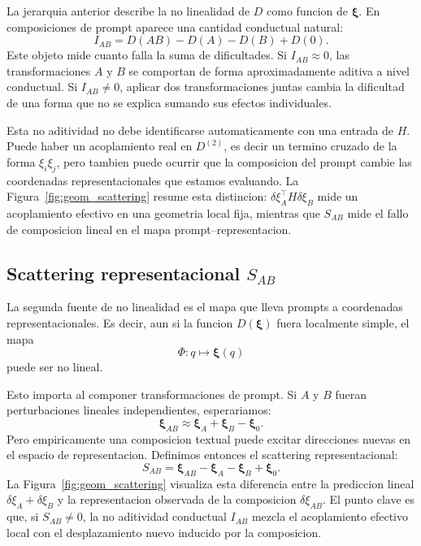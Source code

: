 \documentclass[10pt,twocolumn]{article}
\newcommand{\xrep}{\bm{\xi}}
\begin{document}
La jerarquia anterior describe la no linealidad de \(D\) como funcion de \(\xrep\). En composiciones de prompt aparece una cantidad conductual natural:
\[
I_{AB}
=
D(AB)-D(A)-D(B)+D(0).
\]
Este objeto mide cuanto falla la suma de dificultades. Si \(I_{AB}\approx0\), las transformaciones \(A\) y \(B\) se comportan de forma aproximadamente aditiva a nivel conductual. Si \(I_{AB}\neq0\), aplicar dos transformaciones juntas cambia la dificultad de una forma que no se explica sumando sus efectos individuales.

Esta no aditividad no debe identificarse automaticamente con una entrada de \(H\). Puede haber un acoplamiento real en \(D^{(2)}\), es decir un termino cruzado de la forma \(\xi_i\xi_j\), pero tambien puede ocurrir que la composicion del prompt cambie las coordenadas representacionales que estamos evaluando. La Figura~\ref{fig:geom_scattering} resume esta distincion: \(\delta\xi_A^\top H\delta\xi_B\) mide un acoplamiento efectivo en una geometria local fija, mientras que \(S_{AB}\) mide el fallo de composicion lineal en el mapa prompt--representacion.

\subsection{Scattering representacional \texorpdfstring{\(S_{AB}\)}{SAB}}

La segunda fuente de no linealidad es el mapa que lleva prompts a coordenadas representacionales. Es decir, aun si la funcion \(D(\xrep)\) fuera localmente simple, el mapa
\[
\Phi:q\longmapsto\xrep(q)
\]
puede ser no lineal.

Esto importa al componer transformaciones de prompt. Si \(A\) y \(B\) fueran perturbaciones lineales independientes, esperariamos:
\[
\xrep_{AB}
\approx
\xrep_A+\xrep_B-\xrep_0.
\]
Pero empiricamente una composicion textual puede excitar direcciones nuevas en el espacio de representacion. Definimos entonces el scattering representacional:
\[
S_{AB}
=
\xrep_{AB}
-\xrep_A
-\xrep_B
+\xrep_0.
\]
La Figura~\ref{fig:geom_scattering} visualiza esta diferencia entre la prediccion lineal \(\delta\xi_A+\delta\xi_B\) y la representacion observada de la composicion \(\delta\xi_{AB}\). El punto clave es que, si \(S_{AB}\neq0\), la no aditividad conductual \(I_{AB}\) mezcla el acoplamiento efectivo local con el desplazamiento nuevo inducido por la composicion.
\end{document}
